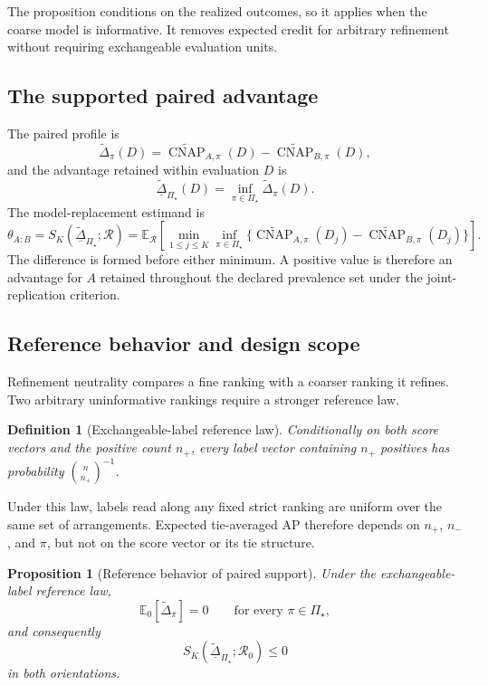 \documentclass[11pt]{article}
\newcommand{\CNAP}{\operatorname{CNAP}}
\newcommand{\Regime}{\mathcal{R}}
\newcommand{\PSet}{\Pi_\star}
\newcommand{\E}{\mathbb{E}}
\newcommand{\CNAPta}{\widetilde{\CNAP}}
\newcommand{\Dta}{\widetilde{\Delta}}
\newcommand{\RobDta}{\underline{\widetilde{\Delta}}_{\PSet}}
\newtheorem{definition}{Definition}
\newtheorem{proposition}{Proposition}
\theoremstyle{remark}
\begin{document}
The proposition conditions on the realized outcomes, so it applies when the coarse model is informative. It removes expected credit for arbitrary refinement without requiring exchangeable evaluation units.

\subsection{The supported paired advantage}

The paired profile is
\[
\Dta_\pi(D)
=
\CNAPta_{A,\pi}(D)
-
\CNAPta_{B,\pi}(D),
\]
and the advantage retained within evaluation $D$ is
\[
\RobDta(D)
=
\inf_{\pi\in\PSet}\Dta_\pi(D).
\]
The model-replacement estimand is
\begin{equation}
\theta_{A:B}
=
S_K(\RobDta;\Regime)
=
\E_{\Regime}
\left[
\min_{1\leq j\leq K}
\inf_{\pi\in\PSet}
\{\CNAPta_{A,\pi}(D_j)-\CNAPta_{B,\pi}(D_j)\}
\right].
\label{eq:paired-estimand}
\end{equation}
The difference is formed before either minimum. A positive value is therefore an advantage for $A$ retained throughout the declared prevalence set under the joint-replication criterion.

\subsection{Reference behavior and design scope}
\label{sec:paired-scope}

Refinement neutrality compares a fine ranking with a coarser ranking it refines. Two arbitrary uninformative rankings require a stronger reference law.

\begin{definition}[Exchangeable-label reference law]
\label{def:exchangeable}
Conditionally on both score vectors and the positive count $n_+$, every label vector containing $n_+$ positives has probability $\binom{n}{n_+}^{-1}$.
\end{definition}

Under this law, labels read along any fixed strict ranking are uniform over the same set of arrangements. Expected tie-averaged AP therefore depends on $n_+$, $n_-$, and $\pi$, but not on the score vector or its tie structure.

\begin{proposition}[Reference behavior of paired support]
\label{prop:paired-reference}
Under the exchangeable-label reference law,
\[
\E_0[\Dta_\pi]=0
\qquad\text{for every }\pi\in\PSet,
\]
and consequently
\[
S_K(\RobDta;\Regime_0)\leq0
\]
in both orientations.
\end{proposition}
\end{document}
